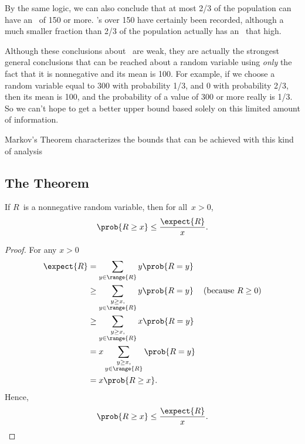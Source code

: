 By the same logic, we can also conclude that at most 2/3 of the
population can have an \IQ\ of 150 or more.  \IQ's over 150 have
certainly been recorded, although a much smaller fraction than 2/3 of
the population actually has an \IQ\ that high.

Although these conclusions about \IQ\ are weak, they are actually the
strongest general conclusions that can be reached about a random
variable using \emph{only} the fact that it is nonnegative and its
mean is 100.  For example, if we choose a random variable equal to 300
with probability 1/3, and 0 with probability 2/3, then its mean is
100, and the probability of a value of 300 or more really is 1/3.  So
we can't hope to get a better upper bound based solely on this limited
amount of information.

Markov's Theorem characterizes the bounds that can be achieved with
this kind of analysis

\subsection{The Theorem}

\begin{theorem}\label{thm:markov}
  If $R$~is a nonnegative random variable, then for all~$x > 0$,
  \begin{equation*}
    \prob{R \geq x} \leq \frac{\expect{R}}{x}.
  \end{equation*}
\end{theorem}

\begin{proof}%
For any $x > 0$
\begin{align}
  \expect{R}
  & = \sum_{y \in \range{R}} y\prob{R=y}\notag\\
  & \geq \sum_{\substack{y \geq x,\\ y \in \range{R}}} y\prob{R=y} & \text{(because $R \geq 0$)}\notag\\
  & \geq \sum_{\substack{y \geq x,\\ y \in \range{R}}} x\prob{R=y}\notag\\
  & = x \sum_{\substack{y \geq x,\\ y \in \range{R}}} \prob{R=y}\notag\\
  & = x \prob{R \geq x}.\label{markovproof}
\end{align}
Hence,
\begin{equation*}
    \prob{R \ge x} \le \frac{\expect{R}}{x}. \qedhere
\end{equation*}
\end{proof}

